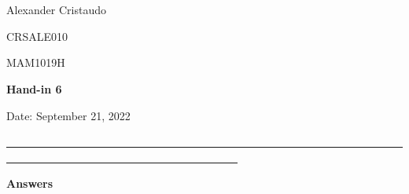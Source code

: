 \documentclass[12pt, a4paper]{exam}
\begin{document}
	\noindent
	\begin{minipage}[l]{0.1\textwidth}
		\noindent
	\end{minipage}
\hfill
\begin{minipage}[c]{1.0\textwidth} %
	\begin{center}
		
		{
		\large \ \ \par
		\large \ \ \par
		\large  Alexander Cristaudo \par
		\small	CRSALE010	\par
		\large	MAM1019H	\par
	\large \textbf{Hand-in 6}	\par
\small	Date: September 21, 2022}
	\end{center}
\end{minipage}
\par
\vspace{0.2in}
\noindent
\uline{ \ \ \ \ \ \ \ \ \ \ \ \ \ \ \ \ \ \ \ \ \ \ \ \ \ \ \ \ \ \ \ \ \ \ \ \ \ \ \ \ \ \ \ \ \ \ \ \ \ \ \ \ \ \ \ \ \ \ \ \ \ \ \ \ \ \ \ \ \ \ \ \ \ \ \ \ \ \  \ \ \ \ \ \ \ \ \ \ \ \ \ \  \ \ \ \ \ \ \ \ \ \ \ \ \ \ \ \ \ \ \ \ \ \ }
\par 
\vspace{0.15in}
\noindent
\centering
{\small \bfseries 	Answers}
\end{document}
